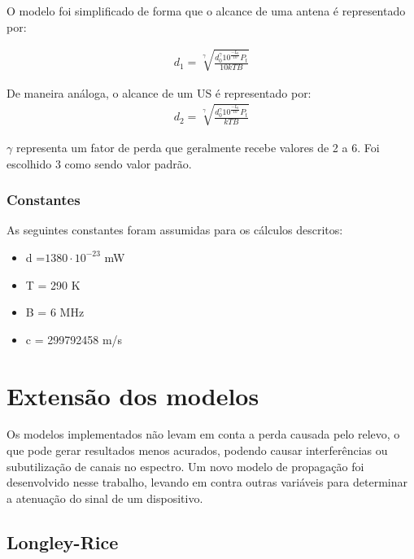 O modelo foi simplificado de forma que o alcance de uma antena é representado por:

\begin{align}
  \label{dLogDistAnt} d_1 = \sqrt[\gamma]{\frac{d_0^{\gamma}10^{\frac{-L_0}{10}}  P_t}{10kTB}}
\end{align}

De maneira análoga, o alcance de um US é representado por:
\begin{align}
  \label{dLogDistDev} d_2 = \sqrt[\gamma]{\frac{d_0^{\gamma}10^{\frac{-L_0}{10}}  P_t}{kTB}}
\end{align}

\begin{math}\gamma \end{math} representa um fator de perda que geralmente recebe valores de 2 a 6. Foi escolhido 3 como sendo valor padrão.

\subsubsection{Constantes}

As seguintes constantes foram assumidas para os cálculos descritos:

\begin{itemize}
\item d =\begin{math}1380\cdot 10^{-23}\end{math}  mW
\item T = 290 K
\item B = 6 MHz
\item c = 299792458 m/s
\end{itemize}

\section{Extensão dos modelos}

Os modelos implementados não levam em conta a perda causada pelo relevo, o que pode gerar resultados menos acurados, podendo causar interferências ou subutilização de canais no espectro. Um novo modelo de propagação foi desenvolvido nesse trabalho, levando em contra outras variáveis para determinar a atenuação do sinal de um dispositivo.

\subsection{Longley-Rice}
\label{subsec:longleyricesection}


